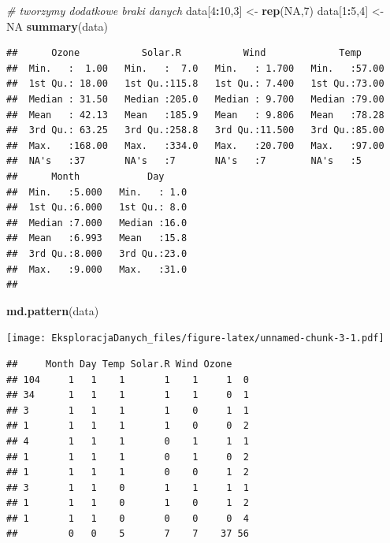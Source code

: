 \documentclass[]{book}
\newenvironment{Shaded}{\begin{snugshade}}{\end{snugshade}}
\newcommand{\CommentTok}[1]{\textcolor[rgb]{0.56,0.35,0.01}{\textit{#1}}}
\newcommand{\DecValTok}[1]{\textcolor[rgb]{0.00,0.00,0.81}{#1}}
\newcommand{\KeywordTok}[1]{\textcolor[rgb]{0.13,0.29,0.53}{\textbf{#1}}}
\newcommand{\NormalTok}[1]{#1}
\newcommand{\OperatorTok}[1]{\textcolor[rgb]{0.81,0.36,0.00}{\textbf{#1}}}
\newcommand{\OtherTok}[1]{\textcolor[rgb]{0.56,0.35,0.01}{#1}}
\newcommand{\StringTok}[1]{\textcolor[rgb]{0.31,0.60,0.02}{#1}}
\theoremstyle{plain}
\theoremstyle{definition}
\theoremstyle{definition}
\theoremstyle{definition}
\theoremstyle{definition}
\theoremstyle{remark}
\begin{document}
\begin{Shaded}
\begin{Highlighting}[]
\CommentTok{# tworzymy dodatkowe braki danych}
\NormalTok{data[}\DecValTok{4}\OperatorTok{:}\DecValTok{10}\NormalTok{,}\DecValTok{3}\NormalTok{] <-}\StringTok{ }\KeywordTok{rep}\NormalTok{(}\OtherTok{NA}\NormalTok{,}\DecValTok{7}\NormalTok{)}
\NormalTok{data[}\DecValTok{1}\OperatorTok{:}\DecValTok{5}\NormalTok{,}\DecValTok{4}\NormalTok{] <-}\StringTok{ }\OtherTok{NA}
\KeywordTok{summary}\NormalTok{(data)}
\end{Highlighting}
\end{Shaded}

\begin{verbatim}
##      Ozone           Solar.R           Wind             Temp      
##  Min.   :  1.00   Min.   :  7.0   Min.   : 1.700   Min.   :57.00  
##  1st Qu.: 18.00   1st Qu.:115.8   1st Qu.: 7.400   1st Qu.:73.00  
##  Median : 31.50   Median :205.0   Median : 9.700   Median :79.00  
##  Mean   : 42.13   Mean   :185.9   Mean   : 9.806   Mean   :78.28  
##  3rd Qu.: 63.25   3rd Qu.:258.8   3rd Qu.:11.500   3rd Qu.:85.00  
##  Max.   :168.00   Max.   :334.0   Max.   :20.700   Max.   :97.00  
##  NA's   :37       NA's   :7       NA's   :7        NA's   :5      
##      Month            Day      
##  Min.   :5.000   Min.   : 1.0  
##  1st Qu.:6.000   1st Qu.: 8.0  
##  Median :7.000   Median :16.0  
##  Mean   :6.993   Mean   :15.8  
##  3rd Qu.:8.000   3rd Qu.:23.0  
##  Max.   :9.000   Max.   :31.0  
## 
\end{verbatim}

\begin{Shaded}
\begin{Highlighting}[]
\KeywordTok{md.pattern}\NormalTok{(data)}
\end{Highlighting}
\end{Shaded}

\texttt{[image: EksploracjaDanych\_files/figure-latex/unnamed-chunk-3-1.pdf]}

\begin{verbatim}
##     Month Day Temp Solar.R Wind Ozone   
## 104     1   1    1       1    1     1  0
## 34      1   1    1       1    1     0  1
## 3       1   1    1       1    0     1  1
## 1       1   1    1       1    0     0  2
## 4       1   1    1       0    1     1  1
## 1       1   1    1       0    1     0  2
## 1       1   1    1       0    0     1  2
## 3       1   1    0       1    1     1  1
## 1       1   1    0       1    0     1  2
## 1       1   1    0       0    0     0  4
##         0   0    5       7    7    37 56
\end{verbatim}
\end{document}
